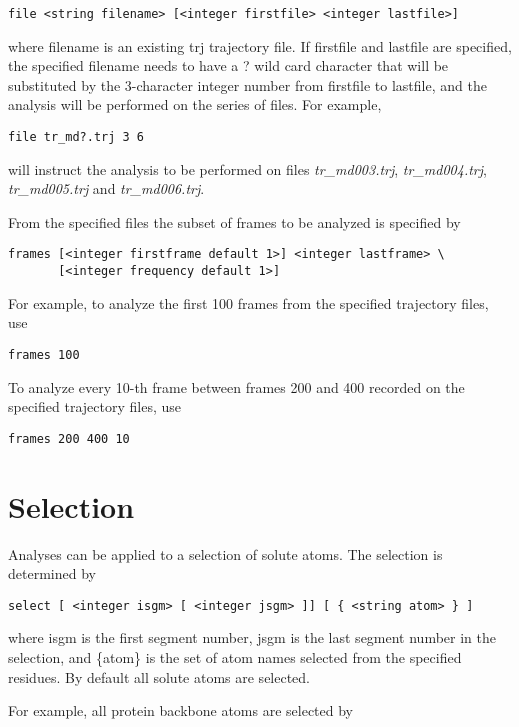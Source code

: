 \begin{verbatim}
file <string filename> [<integer firstfile> <integer lastfile>] 
\end{verbatim}

where {\rm filename} is an existing {\rm trj} trajectory file.
If {\rm firstfile} and {\rm lastfile} are specified, the specified
{\rm filename} needs to have a {\rm ?} wild card character that will 
be substituted by the 3-character integer number from {\rm firstfile} 
to {\rm lastfile}, and the analysis will be performed on the series 
of files.
For example,

\begin{verbatim}
file tr_md?.trj 3 6
\end{verbatim}

will instruct the analysis to be performed on files {\it tr\_md003.trj},
{\it tr\_md004.trj}, {\it tr\_md005.trj} and {\it tr\_md006.trj}.

\par
From the specified files the subset of frames to be analyzed is 
specified by

\begin{verbatim}
frames [<integer firstframe default 1>] <integer lastframe> \
       [<integer frequency default 1>]
\end{verbatim}

For example, to analyze the first 100 frames from the specified
trajectory files, use

\begin{verbatim}
frames 100
\end{verbatim}

To analyze every 10-th frame between frames 200 and 400 recorded on
the specified trajectory files, use

\begin{verbatim}
frames 200 400 10
\end{verbatim}

\section{Selection}

Analyses can be applied to a selection of solute atoms. The selection
is determined by

\begin{verbatim}
select [ <integer isgm> [ <integer jsgm> ]] [ { <string atom> } ]
\end{verbatim}

where {\rm isgm} is the first segment number, {\rm jsgm} is the last 
segment number in the selection, and {\rm \{atom\}} is the set of atom
names selected from the specified residues. By default all solute
atoms are selected.
\par
For example, all protein backbone atoms are selected by

